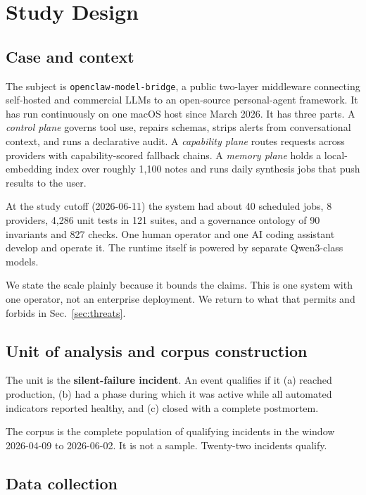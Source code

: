 \documentclass[conference]{IEEEtran}
\begin{document}
\section{Study Design}

\subsection{Case and context}

The subject is \texttt{openclaw-model-bridge}, a public two-layer middleware
connecting self-hosted and commercial LLMs to an open-source personal-agent
framework. It has run continuously on one macOS host since March 2026. It
has three parts. A \emph{control plane} governs tool use, repairs schemas,
strips alerts from conversational context, and runs a declarative audit. A
\emph{capability plane} routes requests across providers with
capability-scored fallback chains. A \emph{memory plane} holds a
local-embedding index over roughly 1{,}100 notes and runs daily synthesis
jobs that push results to the user.

At the study cutoff (2026-06-11) the system had about 40 scheduled jobs, 8
providers, 4{,}286 unit tests in 121 suites, and a governance ontology of 90
invariants and 827 checks. One human operator and one AI coding assistant
develop and operate it. The runtime itself is powered by separate
Qwen3-class models.

We state the scale plainly because it bounds the claims. This is one system
with one operator, not an enterprise deployment. We return to what that
permits and forbids in Sec.~\ref{sec:threats}.

\subsection{Unit of analysis and corpus construction}

The unit is the \textbf{silent-failure incident}. An event qualifies if it
(a) reached production, (b) had a phase during which it was active while all
automated indicators reported healthy, and (c) closed with a complete
postmortem.

The corpus is the complete population of qualifying incidents in the window
2026-04-09 to 2026-06-02. It is not a sample. Twenty-two incidents qualify.

\subsection{Data collection}
\end{document}
